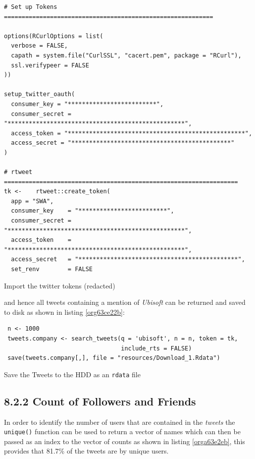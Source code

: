 \documentclass[11pt]{article}
\begin{document}
\begin{listing}[htbp]
\begin{verbatim}
# Set up Tokens ===========================================================

options(RCurlOptions = list(
  verbose = FALSE,
  capath = system.file("CurlSSL", "cacert.pem", package = "RCurl"),
  ssl.verifypeer = FALSE
))

setup_twitter_oauth(
  consumer_key = "*************************",
  consumer_secret = "**************************************************",
  access_token = "**************************************************",
  access_secret = "*********************************************"
)

# rtweet ==================================================================
tk <-    rtweet::create_token(
  app = "SWA",
  consumer_key    = "*************************",
  consumer_secret = "**************************************************",
  access_token    = "**************************************************",
  access_secret   = "*********************************************",
  set_renv        = FALSE
\end{verbatim}
\caption{\label{org95bbb17}Import the twitter tokens (redacted)}
\end{listing}

and hence all tweets containing a mention of \emph{Ubisoft} can be returned and saved to disk as shown in listing \ref{org63ce22b}:

\begin{listing}[htbp]
\begin{verbatim}
 n <- 1000
 tweets.company <- search_tweets(q = 'ubisoft', n = n, token = tk,
                                 include_rts = FALSE)
 save(tweets.company[,], file = "resources/Download_1.Rdata")
\end{verbatim}
\caption{\label{org63ce22b}Save the Tweets to the HDD as an \texttt{rdata} file}
\end{listing}

\subsection{8.2.2 Count of Followers and Friends}
\label{sec:orgaeea5c7}
In order to identify the number of users that are contained in the \emph{tweets} the
\texttt{unique()} function can be used to return a vector of names which can then be passed as an index to the vector of counts as shown in listing \ref{orga63e2eb}, this provides that 81.7\% of the tweets are by unique users.
\end{document}
